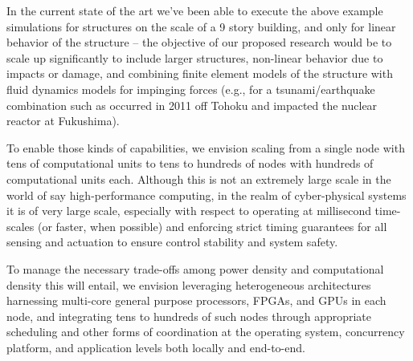 In the current state of the art we've been able to execute the above
example simulations for structures
on the scale of a 9 story building, and only for linear behavior of the
structure -- the objective of our proposed research would be to scale up
significantly to include larger structures, non-linear behavior due to
impacts or damage, and combining finite element models of the structure
with fluid dynamics models for impinging forces (e.g., for a
tsunami/earthquake combination such as occurred in 2011 off Tohoku and
impacted the nuclear reactor at Fukushima).

To enable those kinds of capabilities, we envision scaling from a single
node with tens of computational units to tens to hundreds of nodes with
hundreds of computational units each. Although this is not an extremely
large scale in the world of say high-performance computing, in the realm
of cyber-physical systems it is of very large scale, especially with
respect to operating at millisecond time-scales (or faster, when possible)
and enforcing strict timing guarantees for all sensing and actuation to
ensure control stability and system safety.

To manage the necessary trade-offs among power density and computational
density this will entail, we envision leveraging heterogeneous
architectures harnessing multi-core general purpose processors, FPGAs, and
GPUs in each node, and integrating tens to hundreds of such nodes through
appropriate scheduling and other forms of coordination at the operating
system, concurrency platform, and application levels both locally and
end-to-end.



